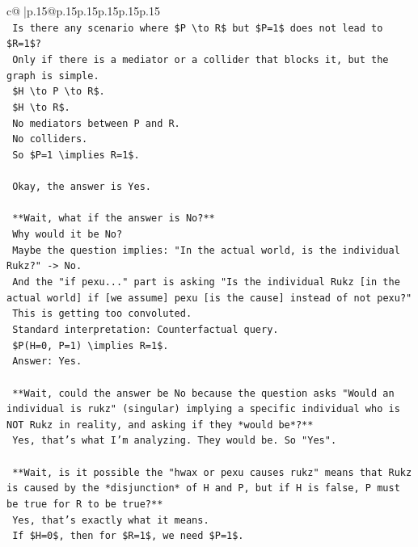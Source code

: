 \documentclass{article}
\begin{document}
{\begin{supertabular}{c@{$\;$}|p{.15\linewidth}@{}p{.15\linewidth}p{.15\linewidth}p{.15\linewidth}p{.15\linewidth}p{.15\linewidth}}
{{{\\ 
\texttt{    Is there any scenario where \$P \textbackslash{}to R\$ but \$P=1\$ does not lead to \$R=1\$?} \\
\texttt{    Only if there is a mediator or a collider that blocks it, but the graph is simple.} \\
\texttt{    \$H \textbackslash{}to P \textbackslash{}to R\$.} \\
\texttt{    \$H \textbackslash{}to R\$.} \\
\texttt{    No mediators between P and R.} \\
\texttt{    No colliders.} \\
\texttt{    So \$P=1 \textbackslash{}implies R=1\$.} \\
\\ 
\texttt{    Okay, the answer is Yes.} \\
\\ 
\texttt{    **Wait, what if the answer is No?**} \\
\texttt{    Why would it be No?} \\
\texttt{    Maybe the question implies: "In the actual world, is the individual Rukz?" {-}> No.} \\
\texttt{    And the "if pexu..." part is asking "Is the individual Rukz {[}in the actual world{]} if {[}we assume{]} pexu {[}is the cause{]} instead of not pexu?"} \\
\texttt{    This is getting too convoluted.} \\
\texttt{    Standard interpretation: Counterfactual query.} \\
\texttt{    \$P(H=0, P=1) \textbackslash{}implies R=1\$.} \\
\texttt{    Answer: Yes.} \\
\\ 
\texttt{    **Wait, could the answer be No because the question asks "Would an individual is rukz" (singular) implying a specific individual who is NOT Rukz in reality, and asking if they *would be*?**} \\
\texttt{    Yes, that's what I'm analyzing. They would be. So "Yes".} \\
\\ 
\texttt{    **Wait, is it possible the "hwax or pexu causes rukz" means that Rukz is caused by the *disjunction* of H and P, but if H is false, P must be true for R to be true?**} \\
\texttt{    Yes, that's exactly what it means.} \\
\texttt{    If \$H=0\$, then for \$R=1\$, we need \$P=1\$.} \\
}}}
\end{supertabular}}
\end{document}
